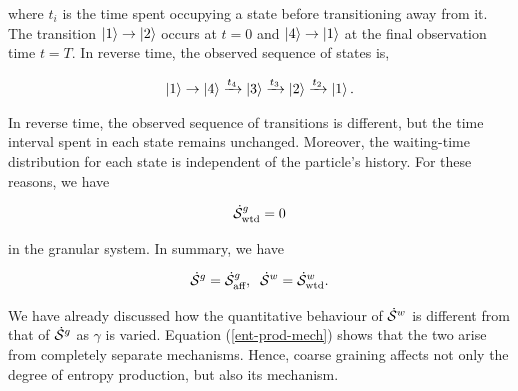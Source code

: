 where $t_i$ is the time spent occupying a state before transitioning away from it. The transition $\ket{1} \rightarrow \ket{2}$ occurs at $t=0$ and $\ket{4} \rightarrow \ket{1}$ at the final observation time $t = T$. In reverse time, the observed sequence of states is,

\begin{align}
\ket{1}\rightarrow\ket{4}\xrightarrow[]{t_4}\ket{3}\xrightarrow{t_3}\ket{2}\xrightarrow{t_2}\ket{1}.
\end{align}

In reverse time, the observed sequence of transitions is different, but the time interval spent in each state remains unchanged. Moreover, the waiting-time distribution for each state is independent of the particle's history. For these reasons, we have

\begin{align}
\dot{\mathcal{S}}^g_{\text{wtd}} = 0
\end{align}

in the granular system. In summary, we have 

\begin{align}\label{ent-prod-mech}
\dot{\mathcal{S}}^g = \dot{\mathcal{S}}^g_{\text{aff}}, \; \; \dot{\mathcal{S}}^w = \dot{\mathcal{S}}^w_{\text{wtd}}.
\end{align}

We have already discussed how the quantitative behaviour of $\dot{\mathcal{S}}^w$ is different from that of $\dot{\mathcal{S}}^g$ as $\gamma$ is varied. Equation (\ref{ent-prod-mech}) shows that the two arise from completely separate mechanisms. Hence, coarse graining affects not only the degree of entropy production, but also its mechanism. 






